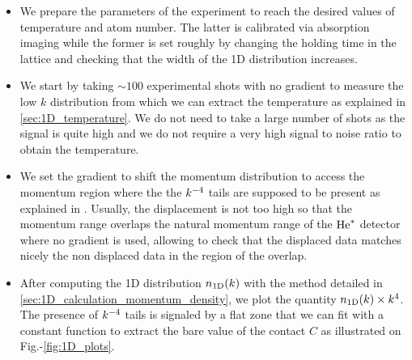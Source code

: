 \begin{itemize}
    \item We prepare the parameters of the experiment to reach the desired values of temperature and atom number. The latter is calibrated via absorption imaging while the former is set roughly by changing the holding time in the lattice and checking that the width of the 1D distribution increases. 
    \item We start by taking $\sim 100$ experimental shots with no gradient to measure the low $k$ distribution from which we can extract the temperature as explained in \ref{sec:1D_temperature}. We do not need to take a large number of shots as the signal is quite high and we do not require a very high signal to noise ratio to obtain the temperature.
    \item We set the gradient to shift the momentum distribution to access the momentum region where the the $k^{-4}$ tails are supposed to be present as explained in . Usually, the displacement is not too high so that the momentum range overlaps the natural momentum range of the $\mathrm{He}^*$ detector where no gradient is used, allowing to check that the displaced data matches nicely the non displaced data in the region of the overlap. 
    \item After computing the 1D distribution $n_{\rm{1D}} (k)$ with the method detailed in \ref{sec:1D_calculation_momentum_density}, we plot the quantity $n_{\rm{1D}} (k) \times k^4$. The presence of $k^{-4}$ tails is signaled by a flat zone that we can fit with a constant function to extract the bare value of the contact $C$ as illustrated on Fig.-\ref{fig:1D_plots}.

    
\end{itemize}  
    
